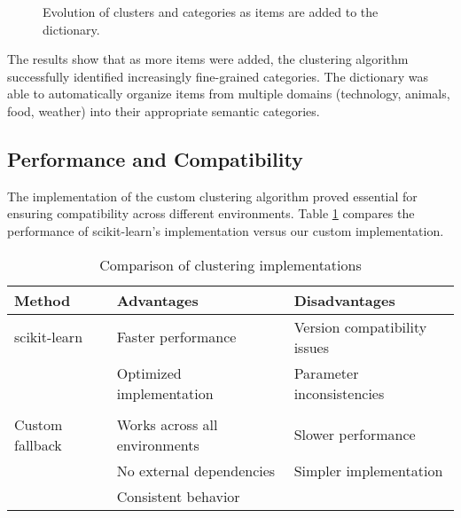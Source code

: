 \documentclass[conference]{IEEEtran}
\begin{document}
\begin{figure}[ht]
\centering
{}
\caption{Evolution of clusters and categories as items are added to the dictionary.}
\label{fig:restructuring}
\end{figure}

The results show that as more items were added, the clustering algorithm successfully identified increasingly fine-grained categories. The dictionary was able to automatically organize items from multiple domains (technology, animals, food, weather) into their appropriate semantic categories.

\subsection{Performance and Compatibility}

The implementation of the custom clustering algorithm proved essential for ensuring compatibility across different environments. Table \ref{tab:compatibility} compares the performance of scikit-learn's implementation versus our custom implementation.

\begin{table}[ht]
\centering
\caption{Comparison of clustering implementations}
\label{tab:compatibility}
\begin{tabular}{@{}lll@{}}
\toprule
\textbf{Method} & \textbf{Advantages} & \textbf{Disadvantages} \\
\midrule
scikit-learn & Faster performance & Version compatibility issues \\
 & Optimized implementation & Parameter inconsistencies \\
 & & \\
Custom fallback & Works across all environments & Slower performance \\
 & No external dependencies & Simpler implementation \\
 & Consistent behavior & \\
\bottomrule
\end{tabular}
\end{table}
\end{document}
